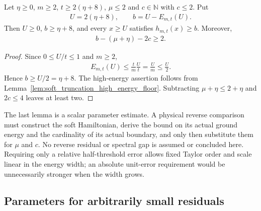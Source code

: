 \begin{lemma}
    \label{lem:soft_reverse_barrier_margin}
    \leanok
    Let $\eta\geq0$, $m\geq2$, $t\geq2(\eta+8)$,
    $\mu\leq2$ and $c\in\mathbb N$ with $c\leq2$. Put
    \begin{align}
        U=2(\eta+8),\qquad b=U-E_{m,t}(U).
    \end{align}
    Then $U\geq0$, $b\geq\eta+8$, and every $x\geq U$ satisfies
    $h_{m,t}(x)\geq b$. Moreover,
    \begin{align}
        b-(\mu+\eta)-2c\geq2.
    \end{align}
\end{lemma}
\begin{proof}\leanok
    Since $0\leq U/t\leq1$ and $m\geq2$,
    \begin{align}
        E_{m,t}(U)
        \leq\frac{t}{m}\frac Ut
        =\frac Um\leq\frac U2.
    \end{align}
    Hence $b\geq U/2=\eta+8$. The high-energy assertion follows
    from Lemma~\ref{lem:soft_truncation_high_energy_floor}.
    Subtracting $\mu+\eta\leq2+\eta$ and $2c\leq4$ leaves at least
    two.
\end{proof}

The last lemma is a scalar parameter estimate. A physical reverse
comparison must construct the soft Hamiltonian, derive the bound on
its actual ground energy and the cardinality of its actual boundary,
and only then substitute them for $\mu$ and $c$. No reverse residual
or spectral gap is assumed or concluded here. Requiring only a
relative half-threshold error allows fixed Taylor order and scale
linear in the energy width; an absolute unit-error requirement would
be unnecessarily stronger when the width grows.


\subsection{Parameters for arbitrarily small residuals}

